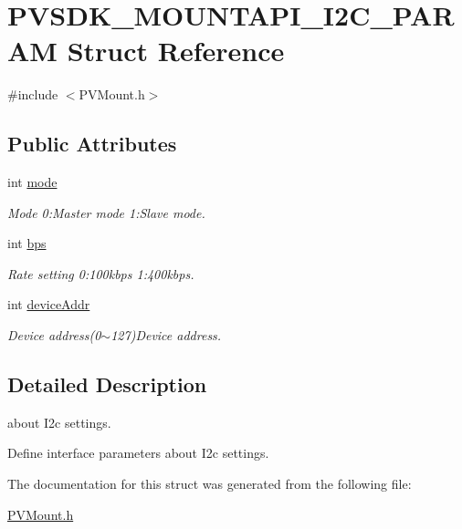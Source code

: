 \hypertarget{struct_p_v_s_d_k___m_o_u_n_t_a_p_i___i2_c___p_a_r_a_m}{}\section{P\+V\+S\+D\+K\+\_\+\+M\+O\+U\+N\+T\+A\+P\+I\+\_\+\+I2\+C\+\_\+\+P\+A\+R\+AM Struct Reference}
\label{struct_p_v_s_d_k___m_o_u_n_t_a_p_i___i2_c___p_a_r_a_m}


{\ttfamily \#include $<$P\+V\+Mount.\+h$>$}

\subsection*{Public Attributes}
\begin{DoxyCompactItemize}
\item 
\mbox{\label{struct_p_v_s_d_k___m_o_u_n_t_a_p_i___i2_c___p_a_r_a_m_abb11b0ffb7b2c3b3af41bb721652da4e}} 
int \hyperlink{struct_p_v_s_d_k___m_o_u_n_t_a_p_i___i2_c___p_a_r_a_m_abb11b0ffb7b2c3b3af41bb721652da4e}{mode}
\begin{DoxyCompactList}\small\item\em Mode 0\+:Master mode 1\+:Slave mode. \end{DoxyCompactList}\item 
\mbox{\label{struct_p_v_s_d_k___m_o_u_n_t_a_p_i___i2_c___p_a_r_a_m_a4829373f8818886ad86e6cce09282a7b}} 
int \hyperlink{struct_p_v_s_d_k___m_o_u_n_t_a_p_i___i2_c___p_a_r_a_m_a4829373f8818886ad86e6cce09282a7b}{bps}
\begin{DoxyCompactList}\small\item\em Rate setting 0\+:100kbps 1\+:400kbps. \end{DoxyCompactList}\item 
\mbox{\label{struct_p_v_s_d_k___m_o_u_n_t_a_p_i___i2_c___p_a_r_a_m_a1c46d0e41cd2787b65ae4cdd0d90652f}} 
int \hyperlink{struct_p_v_s_d_k___m_o_u_n_t_a_p_i___i2_c___p_a_r_a_m_a1c46d0e41cd2787b65ae4cdd0d90652f}{device\+Addr}
\begin{DoxyCompactList}\small\item\em Device address(0$\sim$127)Device address. \end{DoxyCompactList}\end{DoxyCompactItemize}


\subsection{Detailed Description}
about I2c settings.

Define interface parameters about I2c settings. 

The documentation for this struct was generated from the following file\+:\begin{DoxyCompactItemize}
\item 
\hyperlink{_p_v_mount_8h}{P\+V\+Mount.\+h}\end{DoxyCompactItemize}

